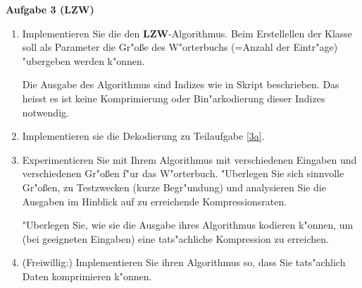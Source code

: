 \documentclass[a4paper]{article}
\begin{document}
\bigskip

{\bf Aufgabe 3  \quad(LZW)}\\
\begin{enumerate}
\item\label{3a} Implementieren Sie die den {\bf LZW}-Algorithmus. Beim Erstellellen der Klasse soll als Parameter die Gr"o{\ss}e des W"orterbuchs (=Anzahl der Eintr"age) "ubergeben werden k"onnen.

Die Ausgabe des Algorithmus sind Indizes wie in Skript beschrieben. Das heisst es ist keine Komprimierung oder Bin"arkodierung dieser Indizes notwendig.

\item Implementieren sie die Dekodierung zu Teilaufgabe \ref{3a}.
\item Experimentieren Sie mit Ihrem Algorithmus mit verschiedenen Eingaben und verschiedenen Gr"o{\ss}en f"ur das W"orterbuch. "Uberlegen Sie sich sinnvolle Gr"o{\ss}en, zu Testzwecken (kurze Begr"undung) und analysieren Sie die Ausgaben im Hinblick auf zu erreichende Kompressionsraten.

"Uberlegen Sie, wie sie die Ausgabe ihres Algorithmus kodieren k"onnen, um (bei geeigneten Eingaben) eine tats"achliche Kompression zu erreichen.

\item(Freiwillig:) Implementieren Sie ihren Algorithmus so, dass Sie tats"achlich Daten komprimieren k"onnen.
\end{enumerate}
\end{document}
